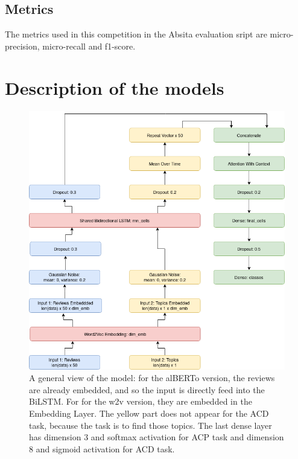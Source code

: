 \documentclass{article}
\begin{document}
        \subsection{Metrics}\label{subsec:metrics}
        The metrics used in this competition in the Absita evaluation sript are micro-precision, micro-recall and f1-score.

    \section{Description of the models}\label{sec:s3}
        \begin{figure}
            \includegraphics[width=\linewidth]{imgs/model.png}
            \caption{A general view of the model: for the alBERTo version, the reviews are already embedded, and so the input is directly feed into the BiLSTM.
            For for the w2v version, they are embedded in the Embedding Layer.
            The yellow part does not appear for the ACD task, because the task is to find those topics.
            The last dense layer has dimension 3 and softmax activation for ACP task and dimension 8 and sigmoid activation for ACD task.}
            \label{fig:model}
        \end{figure}
\end{document}
